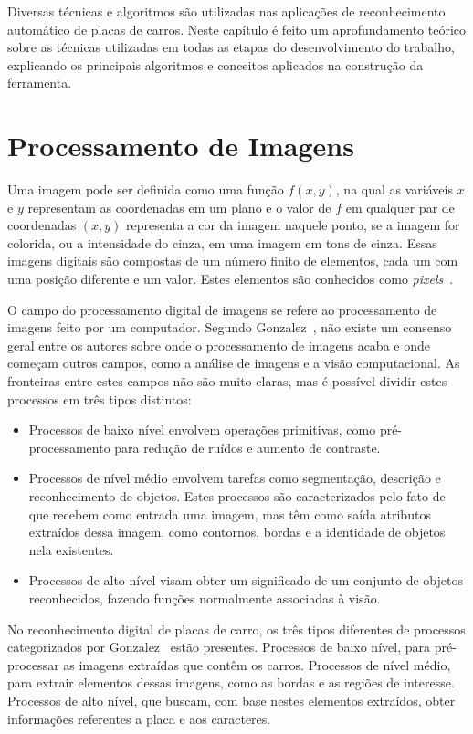 Diversas técnicas e algoritmos são utilizadas nas aplicações de reconhecimento automático de placas de carros. Neste capítulo é feito um aprofundamento teórico sobre as técnicas utilizadas em todas as etapas do desenvolvimento do trabalho, explicando os principais algoritmos e conceitos aplicados na construção da ferramenta.

\section{Processamento de Imagens}
\label{sec:processamentoimagens}

Uma imagem pode ser definida como uma função $f(x, y)$, na qual as variáveis $x$ e $y$ representam as coordenadas em um plano e o valor de $f$ em qualquer par de coordenadas $(x, y)$ representa a cor da imagem naquele ponto, se a imagem for colorida, ou a intensidade do cinza, em uma imagem em tons de cinza. Essas imagens digitais são compostas de um número finito de elementos, cada um com uma posição diferente e um valor. Estes elementos são conhecidos como \emph{pixels}~\cite{gonzalez1977digital}.

O campo do processamento digital de imagens se refere ao processamento de imagens feito por um computador. Segundo Gonzalez~\cite{gonzalez1977digital}, não existe um consenso geral entre os autores sobre onde o processamento de imagens acaba e onde começam outros campos, como a análise de imagens e a visão computacional. As fronteiras entre estes campos não são muito claras, mas é possível dividir estes processos em três tipos distintos:

\begin{itemize}
	\item Processos de baixo nível envolvem operações primitivas, como pré-processamento para redução de ruídos e aumento de contraste.
    \item Processos de nível médio envolvem tarefas como segmentação, descrição e reconhecimento de objetos. Estes processos são caracterizados pelo fato de que recebem como entrada uma imagem, mas têm como saída atributos extraídos dessa imagem, como contornos, bordas e a identidade de objetos nela existentes.
    \item Processos de alto nível visam obter um significado de um conjunto de objetos reconhecidos, fazendo funções normalmente associadas à visão.
\end{itemize}

No reconhecimento digital de placas de carro, os três tipos diferentes de processos categorizados por Gonzalez~\cite{gonzalez1977digital} estão presentes. Processos de baixo nível, para pré-processar as imagens extraídas que contêm os carros. Processos de nível médio, para extrair elementos dessas imagens, como as bordas e as regiões de interesse. Processos de alto nível, que buscam, com base nestes elementos extraídos, obter informações referentes a placa e aos caracteres.

